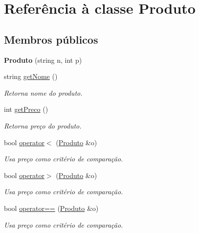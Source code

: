 \hypertarget{classProduto}{\section{Referência à classe Produto}
\label{classProduto}
}
\subsection*{Membros públicos}
\begin{DoxyCompactItemize}
\item 
\hypertarget{classProduto_af8a28945544529a5bb1b6f5da2e89625}{{\bfseries Produto} (string n, int p)}\label{classProduto_af8a28945544529a5bb1b6f5da2e89625}

\item 
string \hyperlink{classProduto_ab85f6765ddb66a6100c7aa7d7ba379e6}{get\-Nome} ()
\begin{DoxyCompactList}\small\item\em Retorna nome do produto. \end{DoxyCompactList}\item 
int \hyperlink{classProduto_ad646a0dfabe3761ce7f9140db045404c}{get\-Preco} ()
\begin{DoxyCompactList}\small\item\em Retorna preço do produto. \end{DoxyCompactList}\item 
bool \hyperlink{classProduto_ad0983b854c092a1032931693cfa4a915}{operator$<$} (\hyperlink{classProduto}{Produto} \&o)
\begin{DoxyCompactList}\small\item\em Usa preço como critério de comparação. \end{DoxyCompactList}\item 
bool \hyperlink{classProduto_ad39e0021d4c0cd8bf63b669c8000345e}{operator$>$} (\hyperlink{classProduto}{Produto} \&o)
\begin{DoxyCompactList}\small\item\em Usa preço como critério de comparação. \end{DoxyCompactList}\item 
bool \hyperlink{classProduto_a2796bcb084171159ddc67a551c2f1c1e}{operator==} (\hyperlink{classProduto}{Produto} \&o)
\begin{DoxyCompactList}\small\item\em Usa preço como critério de comparação. \end{DoxyCompactList}\end{DoxyCompactItemize}


